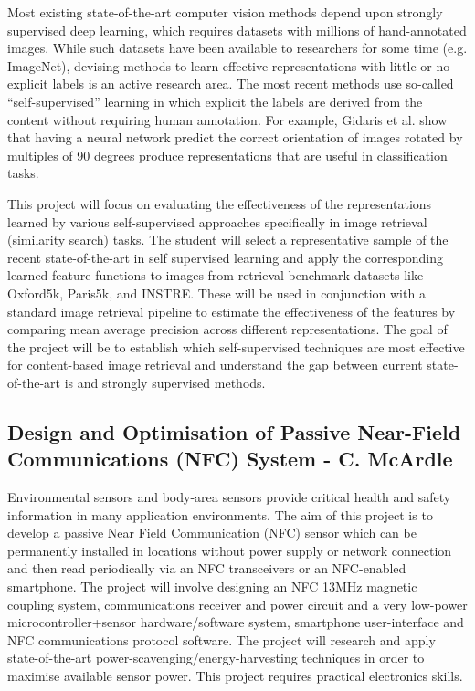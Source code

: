\documentclass[a4paper]{article}
\begin{document}
Most existing state-of-the-art computer vision methods depend upon strongly supervised deep learning, which requires datasets with millions of hand-annotated images. While such datasets have been available to researchers for some time (e.g. ImageNet), devising methods to learn effective representations with little or no explicit labels is an active research area. The most recent methods use so-called “self-supervised” learning in which explicit the labels are derived from the content without requiring human annotation. For example, Gidaris et al. show that having a neural network predict the correct orientation of images rotated by multiples of 90 degrees produce representations that are useful in classification tasks.

This project will focus on evaluating the effectiveness of the representations learned by various self-supervised approaches specifically in image retrieval (similarity search) tasks. The student will select a representative sample of the recent state-of-the-art in self supervised learning and apply the corresponding learned feature functions to images from retrieval benchmark datasets like Oxford5k, Paris5k, and INSTRE. These will be used in conjunction with a standard image retrieval pipeline to estimate the effectiveness of the features by comparing mean average precision across different representations. The goal of the project will be to establish which self-supervised techniques are most effective for content-based image retrieval and understand the gap between current state-of-the-art is and strongly supervised methods.

\subsection{Design and Optimisation of Passive Near-Field Communications (NFC)
System - C. McArdle}

Environmental sensors and body-area sensors provide critical health and safety information in many application environments. The aim of this project is to develop a passive Near Field Communication (NFC) sensor which can be permanently installed in locations without power supply or network connection and then read periodically via an NFC transceivers or an NFC-enabled smartphone. The project will involve designing an NFC 13MHz magnetic coupling system, communications receiver and power circuit and a very low-power microcontroller+sensor hardware/software system,  smartphone user-interface and NFC communications protocol software. The project will research and apply state-of-the-art power-scavenging/energy-harvesting techniques in order to maximise available sensor power. This project requires practical electronics skills.
\end{document}
